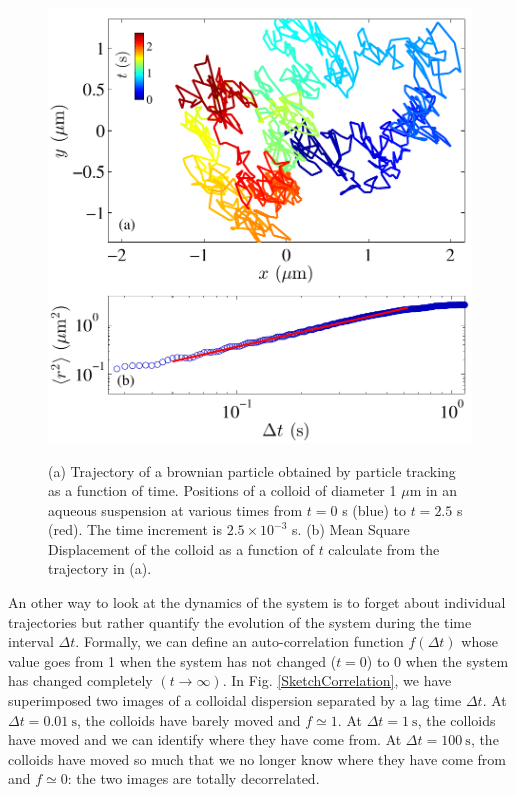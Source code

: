 \documentclass[%
 aip,
 jmp,%
 amsmath,amssymb,
reprint,%
]{revtex4-1}
\begin{document}
\begin{figure}
	\includegraphics[width=\linewidth]{BrownianPres.pdf}\\
	\caption{(a) Trajectory of a brownian particle obtained by particle tracking as a function of time. Positions of a colloid of diameter 1 $\mu$m in an aqueous suspension at various times from $t=0$ s (blue) to $t=2.5$ s (red). The time increment is $2.5 \times 10^{-3}$ s. (b) Mean Square Displacement of the colloid as a function of $t$ calculate from the trajectory in (a). }
	\label{BrownianTrajectory}
\end{figure}

An other way to look at the dynamics of the system is to forget about individual trajectories but rather quantify the evolution of the system during the time interval $\Delta t$. Formally, we can define an auto-correlation function $f(\Delta t)$ whose value goes from 1 when the system has not changed ($t=0$) to 0 when the system has changed completely $(t\rightarrow\infty)$. In Fig. \ref{SketchCorrelation}, we have superimposed two images of a colloidal dispersion separated by a lag time $\Delta t$. At $\Delta t = \SI{0.01}{\second}$, the colloids have barely moved and $f \simeq 1$. At $\Delta t = \SI{1}{\second}$, the colloids have moved and we can identify where they have come from.  At $\Delta t = \SI{100}{\second}$, the colloids have moved so much that we no longer know where they have come from and $f \simeq 0$: the two images are totally decorrelated.
\end{document}

